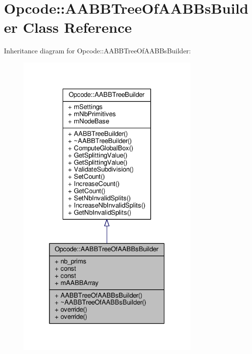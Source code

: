 \hypertarget{classOpcode_1_1AABBTreeOfAABBsBuilder}{}\section{Opcode\+:\+:A\+A\+B\+B\+Tree\+Of\+A\+A\+B\+Bs\+Builder Class Reference}
\label{classOpcode_1_1AABBTreeOfAABBsBuilder}


Inheritance diagram for Opcode\+:\+:A\+A\+B\+B\+Tree\+Of\+A\+A\+B\+Bs\+Builder\+:
\nopagebreak
\begin{figure}[H]
\begin{center}
\leavevmode
\includegraphics[width=256pt]{d6/d15/classOpcode_1_1AABBTreeOfAABBsBuilder__inherit__graph}
\end{center}
\end{figure}


